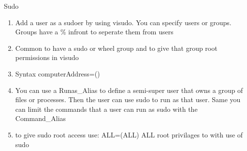 \documentclass{notes}
\begin{document}
\begin{questions}{Sudo}
	\begin{enumerate}
		\item Add a user as a sudoer by using visudo. You can specify users or groups. Groups have a \% infront to seperate them from users
		\item Common to have a sudo or wheel group and to give that group root permissions in visudo
		\item Syntax \ra {} computerAddress=() 
		\item You can use a Runas\_Alias to define a semi-super user that owns a group of files or processes. Then the user can use sudo to run as that user. Same you can limit the commands that a user can run as sudo  with the Command\_Alias
		\item to give sudo root access use:  ALL=(ALL) ALL \ra root privilages to  with use of sudo
	\end{enumerate}
\end{questions}
\end{document}
